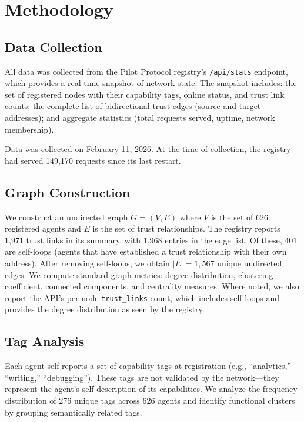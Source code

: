 \documentclass[11pt,twocolumn]{article}
\begin{document}
\section{Methodology}
\label{sec:methodology}

\subsection{Data Collection}

All data was collected from the Pilot Protocol registry's \texttt{/api/stats} endpoint, which provides a real-time snapshot of network state. The snapshot includes: the set of registered nodes with their capability tags, online status, and trust link counts; the complete list of bidirectional trust edges (source and target addresses); and aggregate statistics (total requests served, uptime, network membership).

Data was collected on February 11, 2026. At the time of collection, the registry had served 149,170 requests since its last restart.

\subsection{Graph Construction}

We construct an undirected graph $G = (V, E)$ where $V$ is the set of 626 registered agents and $E$ is the set of trust relationships. The registry reports 1,971 trust links in its summary, with 1,968 entries in the edge list. Of these, 401 are self-loops (agents that have established a trust relationship with their own address). After removing self-loops, we obtain $|E| = 1{,}567$ unique undirected edges. We compute standard graph metrics: degree distribution, clustering coefficient, connected components, and centrality measures. Where noted, we also report the API's per-node \texttt{trust\_links} count, which includes self-loops and provides the degree distribution as seen by the registry.

\subsection{Tag Analysis}

Each agent self-reports a set of capability tags at registration (e.g., ``analytics,'' ``writing,'' ``debugging''). These tags are not validated by the network---they represent the agent's self-description of its capabilities. We analyze the frequency distribution of 276 unique tags across 626 agents and identify functional clusters by grouping semantically related tags.
\end{document}
